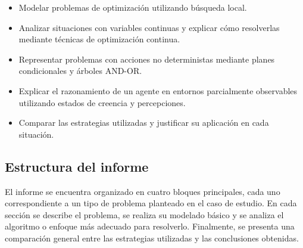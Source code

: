 \begin{itemize}
    \item Modelar problemas de optimización utilizando búsqueda local.
    
    \item Analizar situaciones con variables continuas y explicar cómo resolverlas mediante técnicas de optimización continua.
    
    \item Representar problemas con acciones no deterministas mediante planes condicionales y árboles AND-OR.
    
    \item Explicar el razonamiento de un agente en entornos parcialmente observables utilizando estados de creencia y percepciones.
    
    \item Comparar las estrategias utilizadas y justificar su aplicación en cada situación.
\end{itemize}

\subsection{Estructura del informe}

El informe se encuentra organizado en cuatro bloques principales, cada uno correspondiente a un tipo de problema planteado en el caso de estudio. En cada sección se describe el problema, se realiza su modelado básico y se analiza el algoritmo o enfoque más adecuado para resolverlo. Finalmente, se presenta una comparación general entre las estrategias utilizadas y las conclusiones obtenidas.